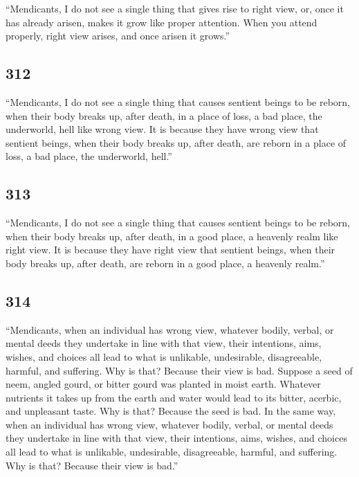\documentclass[12pt,openany]{book}%
\begin{document}
“Mendicants, I do not see a single thing that gives rise to right view, or, once it has already arisen, makes it grow like proper attention. When you attend properly, right view arises, and once arisen it grows.” 

\subsection*{312 }

“Mendicants, I do not see a single thing that causes sentient beings to be reborn, when their body breaks up, after death, in a place of loss, a bad place, the underworld, hell like wrong view. It is because they have wrong view that sentient beings, when their body breaks up, after death, are reborn in a place of loss, a bad place, the underworld, hell.” 

\subsection*{313 }

“Mendicants, I do not see a single thing that causes sentient beings to be reborn, when their body breaks up, after death, in a good place, a heavenly realm like right view. It is because they have right view that sentient beings, when their body breaks up, after death, are reborn in a good place, a heavenly realm.” 

\subsection*{314 }

“Mendicants, when an individual has wrong view, whatever bodily, verbal, or mental deeds they undertake in line with that view, their intentions, aims, wishes, and choices all lead to what is unlikable, undesirable, disagreeable, harmful, and suffering. Why is that? Because their view is bad. Suppose a seed of neem, angled gourd, or bitter gourd was planted in moist earth. Whatever nutrients it takes up from the earth and water would lead to its bitter, acerbic, and unpleasant taste. Why is that? Because the seed is bad. In the same way, when an individual has wrong view, whatever bodily, verbal, or mental deeds they undertake in line with that view, their intentions, aims, wishes, and choices all lead to what is unlikable, undesirable, disagreeable, harmful, and suffering. Why is that? Because their view is bad.” 
\end{document}
